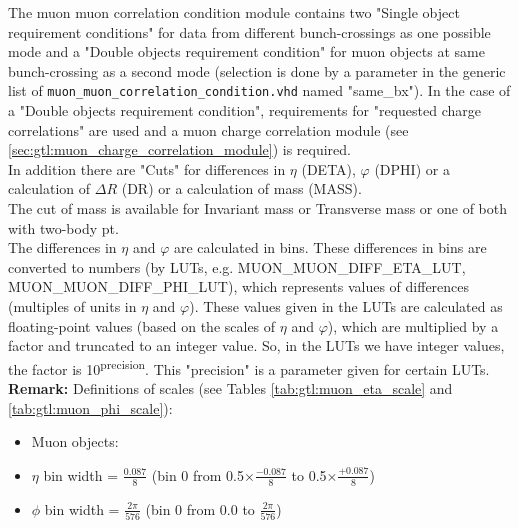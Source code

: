 The muon muon correlation condition module contains two "Single object requirement conditions" for data from different bunch-crossings as one possible mode
and a "Double objects requirement condition" for muon objects at same bunch-crossing as a second mode (selection is done by a parameter in the
generic list of \texttt{muon\_muon\_correlation\_condition.vhd} named "same\_bx"). In the case of a "Double objects requirement condition", requirements for "requested charge correlations"
are used and a muon charge correlation module (see \ref{sec:gtl:muon_charge_correlation_module}) is required.\\
In addition there are "Cuts" for differences in $\eta$ (DETA), $\varphi$ (DPHI) or a calculation of $\Delta$$R$ (DR) or a calculation of mass (MASS).\\
The cut of mass is available for Invariant mass or Transverse mass or one of both with two-body pt.\\
The differences in $\eta$ and $\varphi$ are calculated in bins. These differences in bins are converted to numbers (by LUTs, e.g. \small{MUON\_MUON\_DIFF\_ETA\_LUT, MUON\_MUON\_DIFF\_PHI\_LUT}\normalsize),
which represents values of differences (multiples of units in $\eta$ and $\varphi$).
These values given in the LUTs are calculated as floating-point values (based on the scales of $\eta$ and $\varphi$), which are multiplied by a factor and truncated to an integer value.
So, in the LUTs we have integer values, the factor is 10\textsuperscript{\tiny{precision}\normalsize}. This "precision" is a parameter given for certain LUTs.\\

\textbf{Remark:} Definitions of scales (see Tables \ref{tab:gtl:muon_eta_scale} and \ref{tab:gtl:muon_phi_scale}):
\begin{itemize}
\item Muon objects:
\item $\eta$ bin width = $\frac{0.087}{8}$ (bin 0 from \small{0.5}$\times\frac{-0.087}{8}$ to \small{0.5}$\times\frac{+0.087}{8}$)
\item $\phi$ bin width = $\frac{2\pi}{576}$ (bin 0 from 0.0 to $\frac{2\pi}{576}$)
\end{itemize}

